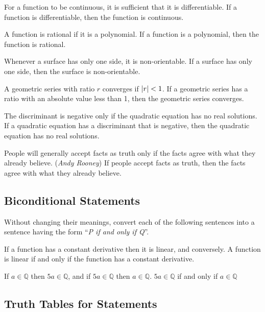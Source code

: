 \documentclass[DIN, pagenumber=false, fontsize=11pt, parskip=half]{scrartcl}
\begin{document}
\begin{problems}
    \problem For a function to be continuous, it is sufficient that it is differentiable.
    \answer  If a function is differentiable, then the function is continuous.

    \problem A function is rational if it is a polynomial.
    \answer If a function is a polynomial, then the function is rational.

    \problem Whenever a surface has only one side, it is non-orientable.
    \answer If a surface has only one side, then the surface is non-orientable.

    \problem A geometric series with ratio $r$ converges if $\lvert r \rvert < 1$.
    \answer If a geometric series has a ratio with an absolute value less than 1, then the geometric series converges.

    \problem The discriminant is negative only if the quadratic equation has no real solutions.
    \answer If a quadratic equation has a discriminant that is negative, then the quadratic equation has no real solutions.

    \problem People will generally accept facts as truth only if the facts agree with what they already believe. (\textit{Andy Rooney})
    \answer If people accept facts as truth, then the facts agree with what they already believe.
\end{problems}

\subsection{Biconditional Statements}

\begin{exercise}{}
    Without changing their meanings, convert each of the following sentences into a sentence having the form ``\textit{P if and only if Q}''.
\end{exercise}

\begin{problems}
    \problem If a function has a constant derivative then it is linear, and conversely.
    \answer A function is linear if and only if the function has a constant derivative.

    \problem If $a \in \mathbb{Q}$ then $5a \in \mathbb{Q}$, and if $5a \in \mathbb{Q}$ then $a \in \mathbb{Q}$.
    \answer $5a \in \mathbb{Q}$ if and only if $a \in \mathbb{Q}$
\end{problems}


\subsection{Truth Tables for Statements}
\end{document}

